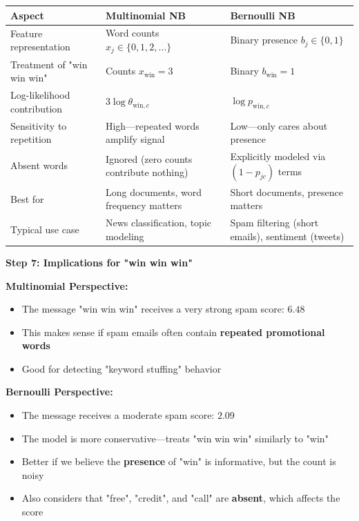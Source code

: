 \documentclass[12pt]{article}
\begin{document}
\begin{solution}
\begin{center}
\begin{tabular}{|l|p{5cm}|p{5cm}|}
\hline
\textbf{Aspect} & \textbf{Multinomial NB} & \textbf{Bernoulli NB} \\
\hline
Feature representation & Word counts $x_j \in \{0,1,2,\ldots\}$ & Binary presence $b_j \in \{0,1\}$ \\
\hline
Treatment of "win win win" & Counts $x_{\text{win}} = 3$ & Binary $b_{\text{win}} = 1$ \\
\hline
Log-likelihood contribution & $3 \log \theta_{\text{win},c}$ & $\log p_{\text{win},c}$ \\
\hline
Sensitivity to repetition & High—repeated words amplify signal & Low—only cares about presence \\
\hline
Absent words & Ignored (zero counts contribute nothing) & Explicitly modeled via $(1-p_{jc})$ terms \\
\hline
Best for & Long documents, word frequency matters & Short documents, presence matters \\
\hline
Typical use case & News classification, topic modeling & Spam filtering (short emails), sentiment (tweets) \\
\hline
\end{tabular}
\end{center}

\textbf{Step 7: Implications for "win win win"}

\textbf{Multinomial Perspective:}
\begin{itemize}
    \item The message "win win win" receives a very strong spam score: $6.48$
    \item This makes sense if spam emails often contain \textbf{repeated promotional words}
    \item Good for detecting "keyword stuffing" behavior
\end{itemize}

\textbf{Bernoulli Perspective:}
\begin{itemize}
    \item The message receives a moderate spam score: $2.09$
    \item The model is more conservative—treats "win win win" similarly to "win"
    \item Better if we believe the \textbf{presence} of "win" is informative, but the count is noisy
    \item Also considers that "free", "credit", and "call" are \textbf{absent}, which affects the score
\end{itemize}


\end{solution}
\end{document}
